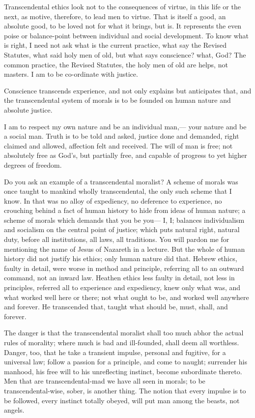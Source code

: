 \documentclass[12pt]{article}
\begin{document}
Transcendental ethics look not to the consequences of virtue, in this life or the next, as motive, therefore, to lead men to virtue. That is itself a good, an absolute good, to be loved not for what it brings, but is. It represents the even poise or balance-point between individual and social development. To know what is right, I need not ask what is the current practice, what say the Revised Statutes, what said holy men of old, but what says conscience? what, God? The common practice, the Revised Statutes, the holy men of old are helps, not masters. I am to be co-ordinate with justice. 

Conscience transcends experience, and not only explains but anticipates that, and the transcendental system of morals is to be founded on human nature and absolute justice. 

I am to respect my own nature and be an individual man,--- your nature and be a social man. Truth is to be told and asked, justice done and demanded, right claimed and allowed, affection felt and received. The will of man is free; not absolutely free as God's, but partially free, and capable of progress to yet higher degrees of freedom. 

Do you ask an example of a transcendental moralist? A scheme of morals was once taught to mankind wholly transcendental, the only such scheme that I know. In that was no alloy of expediency, no deference to experience, no crouching behind a fact of human history to hide from ideas of human nature; a scheme of morals which demands that you be you--- I, I; balances individualism and socialism on the central point of justice; which puts natural right, natural duty, before all institutions, all laws, all traditions. You will pardon me for mentioning the name of Jesus of Nazareth in a lecture. But the whole of human history did not justify his ethics; only human nature did that. Hebrew ethics, faulty in detail, were worse in method and principle, referring all to an outward command, not an inward law. Heathen ethics less faulty in detail, not less in principles, referred all to experience and expediency, knew only what was, and what worked well here or there; not what ought to be, and worked well anywhere and forever. He transcended that, taught what should be, must, shall, and forever.

The danger is that the transcendental moralist shall too much abhor the actual rules of morality; where much is bad and ill-founded, shall deem all worthless. Danger, too, that he take a transient impulse, personal and fugitive, for a universal law; follow a passion for a principle, and come to naught; surrender his manhood, his free will to his unreflecting instinct, become subordinate thereto. Men that are transcendental-mad we have all seen in morals; to be transcendental-wise, sober, is another thing. The notion that every impulse is to be followed, every instinct totally obeyed, will put man among the beasts, not angels. 
\end{document}
